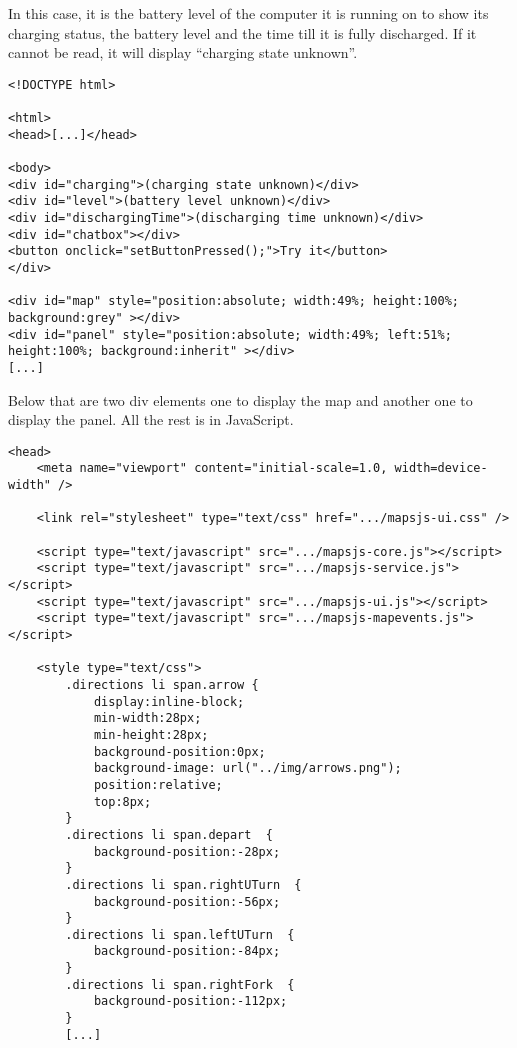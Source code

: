 In this case, it is the battery level of the computer it is running on to show its charging status, the battery level and the time till it is fully discharged. If it cannot be read, it will display ``charging state unknown''.

\begin{verbatim}
<!DOCTYPE html>

<html>
<head>[...]</head>

<body>
<div id="charging">(charging state unknown)</div>
<div id="level">(battery level unknown)</div>
<div id="dischargingTime">(discharging time unknown)</div>
<div id="chatbox"></div>
<button onclick="setButtonPressed();">Try it</button>
</div>

<div id="map" style="position:absolute; width:49%; height:100%; background:grey" ></div>
<div id="panel" style="position:absolute; width:49%; left:51%; height:100%; background:inherit" ></div>
[...]
\end{verbatim}

Below that are two div elements one to display the map and another one to display the panel. All the rest is in JavaScript.

\begin{verbatim}
<head>
    <meta name="viewport" content="initial-scale=1.0, width=device-width" />

    <link rel="stylesheet" type="text/css" href=".../mapsjs-ui.css" />

    <script type="text/javascript" src=".../mapsjs-core.js"></script>
    <script type="text/javascript" src=".../mapsjs-service.js"></script>
    <script type="text/javascript" src=".../mapsjs-ui.js"></script>
    <script type="text/javascript" src=".../mapsjs-mapevents.js"></script>

    <style type="text/css">
        .directions li span.arrow {
            display:inline-block;
            min-width:28px;
            min-height:28px;
            background-position:0px;
            background-image: url("../img/arrows.png");
            position:relative;
            top:8px;
        }
        .directions li span.depart  {
            background-position:-28px;
        }
        .directions li span.rightUTurn  {
            background-position:-56px;
        }
        .directions li span.leftUTurn  {
            background-position:-84px;
        }
        .directions li span.rightFork  {
            background-position:-112px;
        }
        [...]
\end{verbatim}

